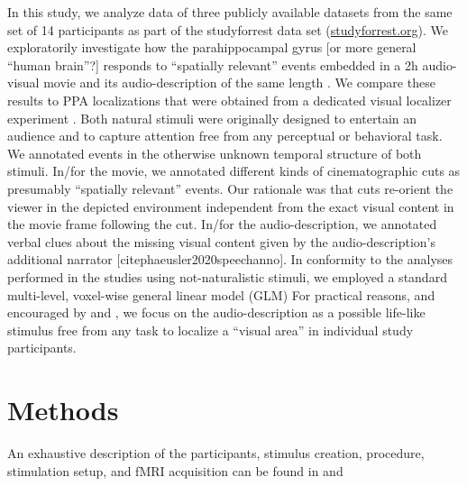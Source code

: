\documentclass[english]{article}
\begin{document}
In this study, we analyze data of three publicly available datasets from the same set of 14 participants as part of the studyforrest data set (\href{http://www.studyforrest.org}{studyforrest.org}).
We exploratorily investigate how the parahippocampal gyrus [or more general ``human brain''?] responds to ``spatially relevant'' events embedded in a 2h audio-visual movie \citep{hanke2016simultaneous} and its audio-description of the same length \citep{hanke2014audiomovie}.
We compare these results to PPA localizations that were obtained from a dedicated visual localizer experiment \citep{sengupta2016extension}.
Both natural stimuli were originally designed to entertain an audience and to capture attention free from any perceptual or behavioral task.
We annotated events in the otherwise unknown temporal structure of both stimuli.
In/for the movie, we annotated different kinds of cinematographic cuts \citep{haeusler2016annotation} as presumably ``spatially relevant'' events.
Our rationale was that cuts re-orient the viewer in the depicted environment independent from the exact visual content in the movie frame following the cut.
In/for the audio-description, we annotated verbal clues about the missing visual content given by the audio-description's additional narrator [citep{haeusler2020speechanno}].
In conformity to the analyses performed in the studies using not-naturalistic stimuli, we employed a standard multi-level, voxel-wise general linear model (GLM) %
For practical reasons, and encouraged by \citep{aziz2008modulation} and \citep{aminoff2013role}, we focus on the audio-description as a possible life-like stimulus free from any task to localize a ``visual area'' in individual study participants.


\section{Methods}
An exhaustive description of the participants, stimulus creation, procedure, stimulation setup, and fMRI acquisition can be found in \citep{hanke2014audiomovie} and \citep{hanke2016simultaneous, sengupta2016extension}
\end{document}
